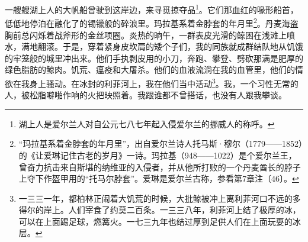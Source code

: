 \par 一艘艘湖上人的大帆船曾驶到这岸边，来寻觅掠夺品\footnote{湖上人是爱尔兰人对自公元七八七年起入侵爱尔兰的挪威人的称呼。}。它们那血红的喙形船首，低低地停泊在融化了的锡镴般的碎浪里。玛拉基系着金脖套的年月里\footnote{“玛拉基系着金脖套的年月里”，出自爱尔兰诗人托马斯·穆尔（1779——1852）的《让爱琳记住古老的岁月》一诗。玛拉基（948——1022）是个爱尔兰王，曾奋力抗击来自斯堪的纳维亚的入侵者，并从他所打败的一个丹麦酋长的脖子上夺下作盔甲用的“托马尔脖套”。爱琳是爱尔兰古称，参看第7章注〔46〕。}。丹麦海盗胸前总闪烁着战斧形的金丝项圈。炎热的晌午，一群表皮光滑的鲸困在浅滩上喷水，满地翻滚。于是，穿着紧身皮坎肩的矮个子们，我的同族就成群结队地从饥饿的牢笼般的城里冲出来。他们手执剥皮用的小刀，奔跑、攀登、劈砍那满是肥厚的绿色脂肪的鲸肉。饥荒、瘟疫和大屠杀。他们的血液流淌在我的血管里，他们的情欲在我身上骚动。在冰封的利菲河上，我在他们当中活动\footnote{一三三一年，都柏林正闹着大饥荒的时候，大批鲸被冲上离利菲河口不远的多得尔的岸上。人们宰食了约莫二百条。一三三八年，利菲河上结了极厚的冰，可以在上面踢足球，燃篝火。一七三九年也结过厚到足供人们在上面玩耍的冰层。}。我，一个习性无常的人，被松脂噼啪作响的火把映照着。我跟谁都不曾搭话，也没有人跟我攀谈。
